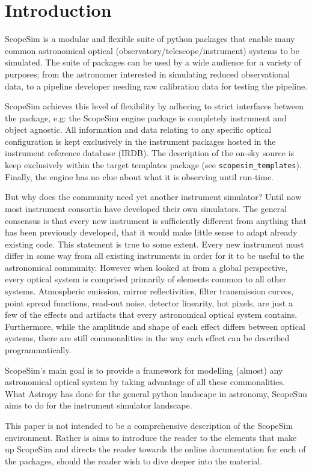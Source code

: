 

\section{Introduction%
  \label{introduction}%
}

ScopeSim is a modular and flexible suite of python packages that enable many common astronomical optical (observatory/telescope/instrument) systems to be simulated.
The suite of packages can be used by a wide audience for a variety of purposes; from the astronomer interested in simulating reduced observational data, to a pipeline developer needing raw calibration data for testing the pipeline.

ScopeSim achieves this level of flexibility by adhering to strict interfaces between the package, e.g: the ScopeSim engine package is completely instrument and object agnostic.
All information and data relating to any specific optical configuration is kept exclusively in the instrument packages hosted in the instrument reference database (IRDB).
The description of the on-sky source is keep exclusively within the target templates package (see \texttt{scopesim\_templates}).
Finally, the engine has no clue about what it is observing until run-time.

But why does the community need yet another instrument simulator?
Until now most instrument consortia have developed their own simulators.
The general consensus is that every new instrument is sufficiently different from anything that has been previously developed, that it would make little sense to adapt already existing code.
This statement is true to some extent.
Every new instrument must differ in some way from all existing instruments in order for it to be useful to the astronomical community.
However when looked at from a global perspective, every optical system is comprised primarily of elements common to all other systems.
Atmospheric emission, mirror reflectivities, filter transmission curves, point spread functions, read-out noise, detector linearity, hot pixels, are just a few of the effects and artifacts that every astronomical optical system contains.
Furthermore, while the amplitude and shape of each effect differs between optical systems, there are still commonalities in the way each effect can be described programmatically.

ScopeSim's main goal is to provide a framework for modelling (almost) any astronomical optical system by taking advantage of all these commonalities.
What Astropy has done for the general python landscape in astronomy, ScopeSim aims to do for the instrument simulator landscape.

This paper is not intended to be a comprehensive description of the ScopeSim environment. Rather is aims to introduce the reader to the elements that make up ScopeSim and directs the reader towards the online documentation for each of the packages, should the reader wish to dive deeper into the material.
